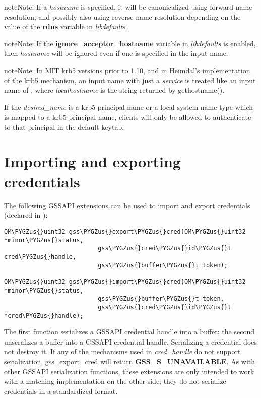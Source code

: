 \documentclass[letterpaper,10pt,english]{sphinxmanual}
\def\PYGZus{\char`\_}
\begin{document}
\begin{notice}{note}{Note:}
If a \emph{hostname} is specified, it will be canonicalized
using forward name resolution, and possibly also using
reverse name resolution depending on the value of the
\textbf{rdns} variable in \emph{libdefaults}.
\end{notice}

\begin{notice}{note}{Note:}
If the \textbf{ignore\_acceptor\_hostname} variable in
\emph{libdefaults} is enabled, then \emph{hostname} will be
ignored even if one is specified in the input name.
\end{notice}

\begin{notice}{note}{Note:}
In MIT krb5 versions prior to 1.10, and in Heimdal's
implementation of the krb5 mechanism, an input name with
just a \emph{service} is treated like an input name of
, where \emph{localhostname} is the
string returned by gethostname().
\end{notice}

If the \emph{desired\_name} is a krb5 principal name or a local system name
type which is mapped to a krb5 principal name, clients will only be
allowed to authenticate to that principal in the default keytab.


\section{Importing and exporting credentials}
\label{appdev/gssapi:importing-and-exporting-credentials}
The following GSSAPI extensions can be used to import and export
credentials (declared in ):

\begin{Verbatim}[commandchars=\\\{\}]
OM\PYGZus{}uint32 gss\PYGZus{}export\PYGZus{}cred(OM\PYGZus{}uint32 *minor\PYGZus{}status,
                          gss\PYGZus{}cred\PYGZus{}id\PYGZus{}t cred\PYGZus{}handle,
                          gss\PYGZus{}buffer\PYGZus{}t token);

OM\PYGZus{}uint32 gss\PYGZus{}import\PYGZus{}cred(OM\PYGZus{}uint32 *minor\PYGZus{}status,
                          gss\PYGZus{}buffer\PYGZus{}t token,
                          gss\PYGZus{}cred\PYGZus{}id\PYGZus{}t *cred\PYGZus{}handle);
\end{Verbatim}

The first function serializes a GSSAPI credential handle into a
buffer; the second unseralizes a buffer into a GSSAPI credential
handle.  Serializing a credential does not destroy it.  If any of the
mechanisms used in \emph{cred\_handle} do not support serialization,
gss\_export\_cred will return \textbf{GSS\_S\_UNAVAILABLE}.  As with other
GSSAPI serialization functions, these extensions are only intended to
work with a matching implementation on the other side; they do not
serialize credentials in a standardized format.
\end{document}
